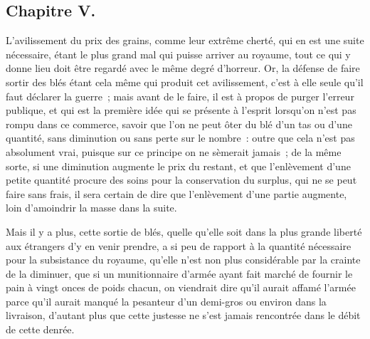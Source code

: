 \documentclass[french,twoside]{book} %
\begin{document}
\subsection[{Chapitre V.}]{Chapitre V.}
\noindent L’avilissement du prix des grains, comme leur extrême cherté, qui en est une suite nécessaire, étant le plus grand mal qui puisse arriver au royaume, tout ce qui y donne lieu doit être regardé avec le même degré d’horreur. Or, la défense de faire sortir des blés étant cela même qui produit cet avilissement, c’est à elle seule qu’il faut déclarer la guerre ; mais avant de le faire, il est à propos de purger l’erreur publique, et qui est la première idée qui se présente à l’esprit lorsqu’on n’est pas rompu dans ce commerce, savoir que l’on ne peut ôter du blé d’un tas ou d’une quantité, sans diminution ou sans perte sur le nombre : outre que cela n’est pas absolument vrai, puisque sur ce principe on ne sèmerait jamais ; de la même sorte, si une diminution augmente le prix du restant, et que l’enlèvement d’une petite quantité procure des soins pour la conservation du surplus, qui ne se peut faire sans frais, il sera certain de dire que l’enlèvement d’une partie augmente, loin d’amoindrir la masse dans la suite.\par
Mais il y a plus, cette sortie de blés, quelle qu’elle soit dans la plus grande liberté aux étrangers d’y en venir prendre, a si peu de rapport à la quantité nécessaire pour la subsistance du royaume, qu’elle n’est non plus considérable par la crainte de la diminuer, que si un munitionnaire d’armée ayant fait marché de fournir le pain à vingt onces de poids chacun, on viendrait dire qu’il aurait affamé l’armée parce qu’il aurait manqué la pesanteur d’un demi-gros ou environ dans la livraison, d’autant plus que cette justesse ne s’est jamais rencontrée dans le débit de cette denrée.\par
\end{document}
